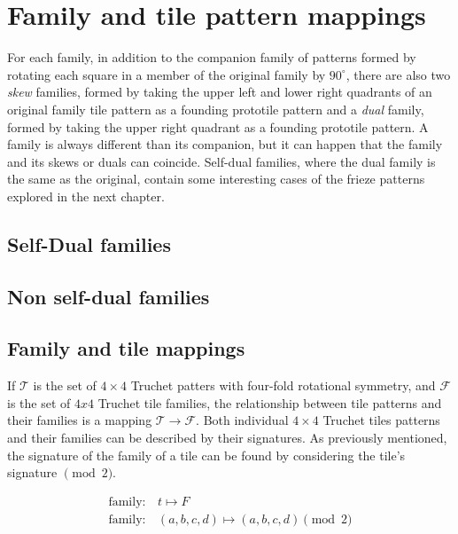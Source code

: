 \documentclass{tufte-book}
\begin{document}
\chapter{Family and tile pattern mappings}

\noindent
For each family, in addition to the companion family of patterns formed by rotating each square in a member of the original family by $90^{\circ}$,  there are also two \textit{skew} families, formed by taking the upper left and lower right quadrants of an original family tile pattern as a founding prototile pattern and a \textit{dual} family, formed by taking the upper right quadrant as a founding prototile pattern. A family is always different than its companion, but it can happen that the family and its skews or duals can coincide. Self-dual families, where the dual family is the same as the original, contain some interesting cases of the frieze patterns explored in the next chapter.

\section{Self-Dual families}


\section{Non self-dual families}


\newpage

\section{Family and tile mappings}
\marginnote{\centering} If $\mathcal{T}$ is the set of $4\times 4$ Truchet patters with four-fold rotational symmetry, and $\mathcal{F}$ is the set of $4x4$ Truchet tile families, the relationship between tile patterns and their families is a mapping $\mathcal{T} \rightarrow \mathcal{F}$. Both individual $4\times 4$ Truchet tiles patterns and their families can be described by their signatures. As previously mentioned, the signature of the family of a tile can be found by considering the tile's signature $\pmod{2}$.

\begin{align*}    
\text{family}:& \, t \mapsto F\\
\text{family}:& \, (a,b,c,d) \mapsto (a, b, c, d) \pmod{2}\\
\end{align*}
\end{document}
